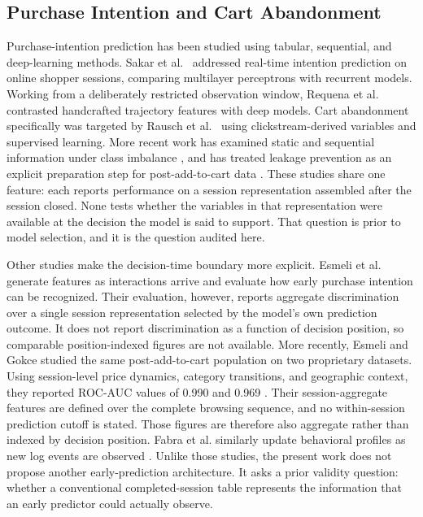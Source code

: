 \documentclass[conference, letterpaper]{IEEEtran}
\begin{document}
\subsection{Purchase Intention and Cart Abandonment}
Purchase-intention prediction has been studied using tabular, sequential, and deep-learning methods. Sakar et al.~\cite{sakar2019} addressed real-time intention prediction on online shopper sessions, comparing multilayer perceptrons with recurrent models. Working from a deliberately restricted observation window, Requena et al.~\cite{requena2020} contrasted handcrafted trajectory features with deep models. Cart abandonment specifically was targeted by Rausch et al.~\cite{rausch2022} using clickstream-derived variables and supervised learning. More recent work has examined static and sequential information under class imbalance \cite{waldmann2025}, and has treated leakage prevention as an explicit preparation step for post-add-to-cart data \cite{suleiman2026}. These studies share one feature: each reports performance on a session representation assembled after the session closed. None tests whether the variables in that representation were available at the decision the model is said to support. That question is prior to model selection, and it is the question audited here.

Other studies make the decision-time boundary more explicit. Esmeli et al.~\cite{esmeli2021} generate features as interactions arrive and evaluate how early purchase intention can be recognized. Their evaluation, however, reports aggregate discrimination over a single session representation selected by the model's own prediction outcome. It does not report discrimination as a function of decision position, so comparable position-indexed figures are not available. More recently, Esmeli and Gokce studied the same post-add-to-cart population on two proprietary datasets. Using session-level price dynamics, category transitions, and geographic context, they reported ROC-AUC values of 0.990 and 0.969 \cite{esmeli2025}. Their session-aggregate features are defined over the complete browsing sequence, and no within-session prediction cutoff is stated. Those figures are therefore also aggregate rather than indexed by decision position. Fabra et al. similarly update behavioral profiles as new log events are observed \cite{fabra2020}. Unlike those studies, the present work does not propose another early-prediction architecture. It asks a prior validity question: whether a conventional completed-session table represents the information that an early predictor could actually observe.
\end{document}
